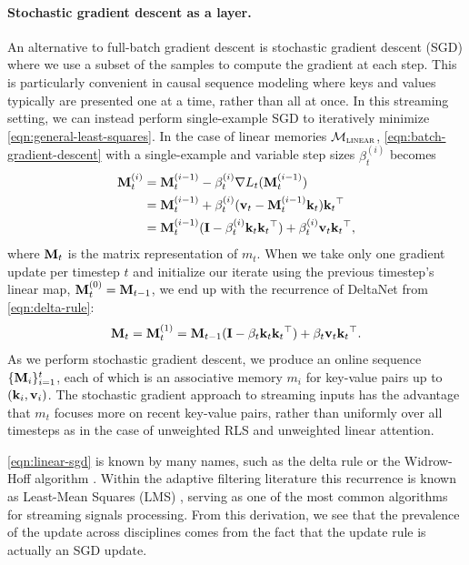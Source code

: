\documentclass[notitlepage, 11pt]{article}
\newcommand*{\memory}{{m}}
\newcommand*{\linearfunctions}{{\Mcal_{\textsc{linear}}}}
\begin{document}
\paragraph{Stochastic gradient descent as a layer.}
An alternative to full-batch gradient descent is stochastic gradient descent (SGD) where we use a subset of the samples to compute the gradient at each step.
This is particularly convenient in causal sequence modeling where keys and values typically are presented one at a time, rather than all at once.
In this streaming setting, we can instead perform single-example SGD to iteratively minimize \autoref{eqn:general-least-squares}.
In the case of linear memories $\linearfunctions$, \autoref{eqn:batch-gradient-descent} with a single-example and variable step sizes $\beta_t^{(i)}$ becomes
\begin{align}
    \mathbf{M}_t^{(i)} &= \mathbf{M}_t^{(i-1)} - \beta_t^{(i)} \nabla L_t(\mathbf{M}_{t}^{(i-1)}) \label{eqn:sgd} \\
    &=\mathbf{M}_{t}^{(i-1)} + \beta_t^{(i)} (\mathbf{v}_t - \mathbf{M}_{t}^{(i-1)}\mathbf{k}_t)\mathbf{k}_t{}^\top \label{eqn:sgd-2} \\
    &= \mathbf{M}_{t}^{(i-1)}(\mathbf{I} - \beta_t^{(i)}\mathbf{k}_t\mathbf{k}_t{}^\top) + \beta_t^{(i)} \mathbf{v}_t\mathbf{k}_t{}^\top, 
\end{align}
where $\mathbf{M}_t$ is the matrix representation of $\memory_t$.
When we take only one gradient update per timestep $t$ and initialize our iterate using the previous timestep's linear map, $\mathbf{M}_t^{(0)} = \mathbf{M}_{t-1}$, we end up with the recurrence of DeltaNet \citep{Schlag2021LinearTransformersAre,Yang2024ParallelizingLinearTransformers} from \autoref{eqn:delta-rule}:
\begin{align}
    \mathbf{M}_t = \mathbf{M}_t^{(1)} = \mathbf{M}_{t-1}(\mathbf{I} - \beta_t\mathbf{k}_t\mathbf{k}_t{}^\top) + \beta_t \mathbf{v}_t\mathbf{k}_t{}^\top\label{eqn:linear-sgd}.
\end{align}
As we perform stochastic gradient descent, we produce an online sequence $\{\mathbf{M}_i\}_{i=1}^t$, each of which is an associative memory $\memory_i$ for key-value pairs up to $(\mathbf{k}_i, \mathbf{v}_i)$.
The stochastic gradient approach to streaming inputs has the advantage that $\memory_t$ focuses more on recent key-value pairs, rather than uniformly over all timesteps as in the case of unweighted RLS and unweighted linear attention.


\autoref{eqn:linear-sgd} is known by many names, such as the delta rule or the Widrow-Hoff algorithm \citep{Widrow1988AdaptiveSwitchingCircuits}.
Within the adaptive filtering literature this recurrence is known as Least-Mean Squares (LMS) \citep{Haykin2014AdaptiveFilterTheory}, serving as one of the most common algorithms for streaming signals processing.
From this derivation, we see that the prevalence of the update across disciplines comes from the fact that the update rule is actually an SGD update.
\end{document}
